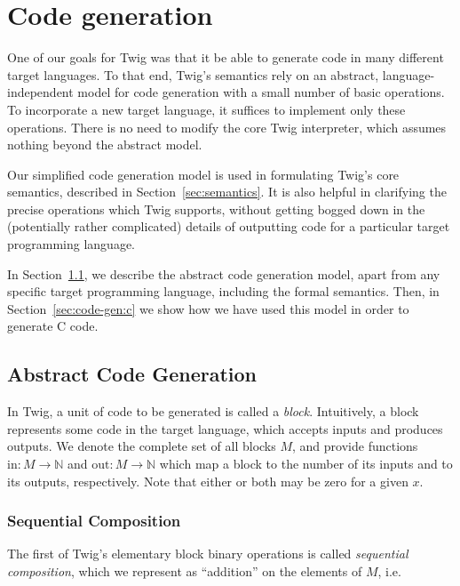 
\section{Code generation}
\label{sec:code-gen}

One of our goals for Twig was that it be able to generate code in many different target languages. To that end, Twig's semantics rely on an abstract, language-independent model for code generation with a small number of basic operations. To incorporate a new target language, it suffices to implement only these operations. There is no need to modify the core Twig interpreter, which assumes nothing beyond the abstract model.

Our simplified code generation model is used in formulating Twig's core semantics, described in Section~\ref{sec:semantics}. It is also helpful in clarifying the precise operations which Twig supports, without getting bogged down in the (potentially rather complicated) details of outputting code for a particular target programming language.

In Section~\ref{sec:code-gen:abstract}, we describe the abstract code generation model, apart from any specific target programming language, including the formal semantics. Then, in Section~\ref{sec:code-gen:c} we show how we have used this model in order to generate C code.

\subsection{Abstract Code Generation}
\label{sec:code-gen:abstract}

In Twig, a unit of code to be generated is called a \emph{block}. Intuitively, a block represents some code in the target language, which accepts inputs and produces outputs. We denote the complete set of all blocks $M$, and provide functions 
$\mbox{in} : M \to \mathbb{N}$ and $\mbox{out} : M \to \mathbb{N}$ which map a block to the number of its inputs and to its outputs, respectively. Note that either or both may be zero for a given $x$.

\subsubsection{Sequential Composition}

The first of Twig's elementary block binary operations is called  \emph{sequential composition}, which we represent as ``addition'' on the elements of $M$, i.e. 

